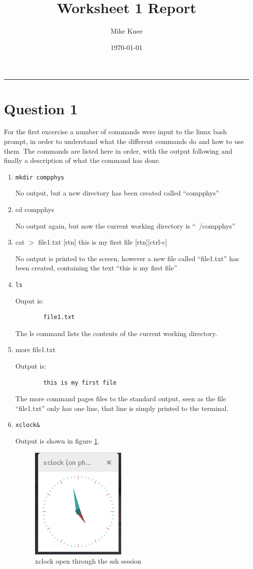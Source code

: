 \documentclass[a4paper,12pt]{UoBnote}
\author{Mike Knee}
\title{Worksheet 1 Report}
\date{\today}
\begin{document}
\maketitle
\tableofcontents
\vspace{1cm}\hrule \vspace{1cm}

\section{Question 1}

For the first excercise a number of commands were input to the linux bash prompt, in order to understand what the different commands do and how to use them. The commands are listed here in order, with the output following and finally a description of what the command has done.
\begin{enumerate}[label=\alph*)]
	\item \texttt{mkdir compphys}

		No output, but a new directory has been created called ``compphys''
	\item cd compphys

		No output again, but now the current working directory is ``~/compphys''
	\item cat $>$ file1.txt [rtn] this is my first file [rtn][ctrl-c]

		No output is printed to the screen, however a new file called ``file1.txt'' has been created, containing the text ``this is my first file''
	\item \texttt{ls}

		Ouput is: 
		\begin{verbatim}
		file1.txt
		\end{verbatim}

		The ls command lists the contents of the current working directory.
	\item more file1.txt

		Output is:
		\begin{verbatim}
		this is my first file
		\end{verbatim}

		The more command pages files to the standard output, seen as the file ``file1.txt'' only has one line, that line is simply printed to the terminal.
	\item \texttt{xclock\&}

		Output is shown in figure \ref{fig:xclock}.
		\begin{figure}
			\centering
			\includegraphics{xclock}
			\caption{xclock open through the ssh session}
			\label{fig:xclock}
		\end{figure}


\end{enumerate}
\end{document}
